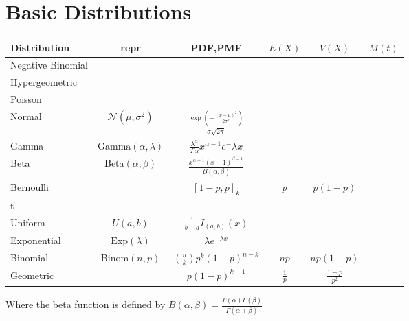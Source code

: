 \onecolumn
\section{Basic Distributions}


\begin{tabular}{ | l || c | c | c | c | c | } \hline
Distribution      & repr
                  & PDF,PMF
                  & $E(X)$
                  & $V(X)$
                  & $M(t)$ \\\hline
Negative Binomial &
                  &
                  &
                  &
                  & \\\hline
Hypergeometric    &
                  &
                  &
                  &
                  & \\\hline
Poisson           &
                  &
                  &
                  &
                  & \\\hline
Normal            & $\mathcal{N}(\mu,\sigma^2)$
                  & $\displaystyle \frac{\exp(-\frac{(x-\mu)^2}{2\sigma^2})}{\sigma\sqrt{2\pi}}$
                  &
                  &
                  & \\\hline
Gamma             & $\mathrm{Gamma}(\alpha, \lambda)$
                  & $\displaystyle \frac{\lambda^\alpha}{\Gamma{\alpha}}x^{\alpha-1}e^-{\lambda x}$
                  &
                  &
                  & \\\hline
Beta              & $\mathrm{Beta}(\alpha, \beta)$
                  & $\displaystyle \frac{x^{\alpha-1}(x-1)^{\beta-1}}{B(\alpha, \beta)}$
                  &
                  &
                  & \\\hline
Bernoulli         &
                  & $[1-p, p]_k$
                  & $p$
                  & $p(1-p)$
                  & \\\hline
t                 &
                  &
                  &
                  &
                  & \\\hline
Uniform           & $U(a, b)$
                  & $\displaystyle \frac{1}{b-a}I_{(a, b)}(x)$
                  &
                  &
                  & \\\hline
Exponential       & $\mathrm{Exp}(\lambda)$
                  & $\displaystyle \lambda e^{-\lambda x}$
                  &
                  &
                  & \\\hline
Binomial          & $\mathrm{Binom}(n, p)$
                  & $\displaystyle \binom{n}{k}p^k(1-p)^{n-k}$
                  & $np$
                  & $np(1-p)$
                  & \\\hline
Geometric         &
                  & $p(1-p)^{k-1}$
                  & $\displaystyle \frac{1}{p}$
                  & $\frac{1-p}{p^2}$
                  & \\\hline

\end{tabular}

Where the beta function is defined by
$\displaystyle B(\alpha,\beta) = \frac{\Gamma(\alpha)\Gamma(\beta)}{\Gamma(\alpha+\beta)}$

\twocolumn
